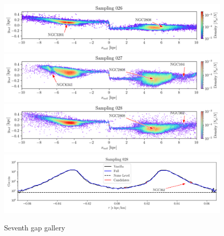 \documentclass{aa}
\begin{document}
\begin{appendix}
    \begin{figure}
      \centering
      \includegraphics[width=\linewidth]{gallery_of_gaps_monte-carlo-026.png}
      \includegraphics[width=\linewidth]{gallery_of_gaps_monte-carlo-027.png}
      \includegraphics[width=\linewidth]{gallery_of_gaps_monte-carlo-028.png}
      \includegraphics[width=\linewidth]{tau-profile-monte-carlo-028.png}
      \caption{Seventh gap gallery}
      \label{fig:gallery6}
      \end{figure}        


\end{appendix}
\end{document}
